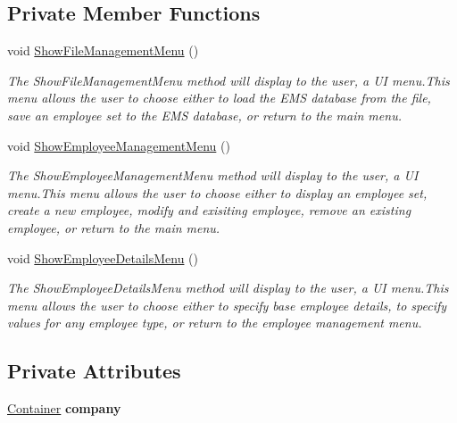 \subsection*{Private Member Functions}
\begin{DoxyCompactItemize}
\item 
void \hyperlink{class_presentation_1_1_u_i_menu_aae74bf481ca23465073a4fbe0b02ee42}{Show\+File\+Management\+Menu} ()
\begin{DoxyCompactList}\small\item\em The Show\+File\+Management\+Menu method will display to the user, a U\+I menu.\+This menu allows the user to choose either to load the E\+M\+S database from the file, save an employee set to the E\+M\+S database, or return to the main menu. \end{DoxyCompactList}\item 
void \hyperlink{class_presentation_1_1_u_i_menu_a2755275ac6f0b154a342ea70d2acf6d1}{Show\+Employee\+Management\+Menu} ()
\begin{DoxyCompactList}\small\item\em The Show\+Employee\+Management\+Menu method will display to the user, a U\+I menu.\+This menu allows the user to choose either to display an employee set, create a new employee, modify and exisiting employee, remove an existing employee, or return to the main menu. \end{DoxyCompactList}\item 
void \hyperlink{class_presentation_1_1_u_i_menu_ab97bfee80ea2bd9d971fba3e79d3b775}{Show\+Employee\+Details\+Menu} ()
\begin{DoxyCompactList}\small\item\em The Show\+Employee\+Details\+Menu method will display to the user, a U\+I menu.\+This menu allows the user to choose either to specify base employee details, to specify values for any employee type, or return to the employee management menu. \end{DoxyCompactList}\end{DoxyCompactItemize}
\subsection*{Private Attributes}
\begin{DoxyCompactItemize}
\item 
\hypertarget{class_presentation_1_1_u_i_menu_ada9168d7b009f78447aa7e748d160585}{}\hyperlink{class_the_company_1_1_container}{Container} {\bfseries company}\label{class_presentation_1_1_u_i_menu_ada9168d7b009f78447aa7e748d160585}

\end{DoxyCompactItemize}


